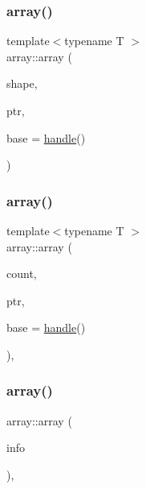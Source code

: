 \subsubsection{\texorpdfstring{array()}{array()}\hspace{0.1cm}{\footnotesize\ttfamily [6/8]}}
{\footnotesize\ttfamily template$<$typename T $>$ \\
array\+::array (\begin{DoxyParamCaption}\item[{\mbox{\hyperlink{classarray_a3378d7821106645fa3a88c5222e127e0}{Shape\+Container}}}]{shape,  }\item[{const T $\ast$}]{ptr,  }\item[{\mbox{\hyperlink{classhandle}{handle}}}]{base = {\ttfamily \mbox{\hyperlink{classhandle}{handle}}()} }\end{DoxyParamCaption})\hspace{0.3cm}{\ttfamily [inline]}}

\mbox{\label{classarray_a3fab95f1c066b62deaf8717fb3e99519}} 
\subsubsection{\texorpdfstring{array()}{array()}\hspace{0.1cm}{\footnotesize\ttfamily [7/8]}}
{\footnotesize\ttfamily template$<$typename T $>$ \\
array\+::array (\begin{DoxyParamCaption}\item[{\mbox{\hyperlink{detail_2common_8h_ac430d16fc097b3bf0a7469cfd09decda}{ssize\+\_\+t}}}]{count,  }\item[{const T $\ast$}]{ptr,  }\item[{\mbox{\hyperlink{classhandle}{handle}}}]{base = {\ttfamily \mbox{\hyperlink{classhandle}{handle}}()} }\end{DoxyParamCaption})\hspace{0.3cm}{\ttfamily [inline]}, {\ttfamily [explicit]}}

\mbox{\label{classarray_afadb342ccfd398c0498ae62277d2a1a9}} 
\subsubsection{\texorpdfstring{array()}{array()}\hspace{0.1cm}{\footnotesize\ttfamily [8/8]}}
{\footnotesize\ttfamily array\+::array (\begin{DoxyParamCaption}\item[{const \mbox{\hyperlink{structbuffer__info}{buffer\+\_\+info}} \&}]{info }\end{DoxyParamCaption})\hspace{0.3cm}{\ttfamily [inline]}, {\ttfamily [explicit]}}



